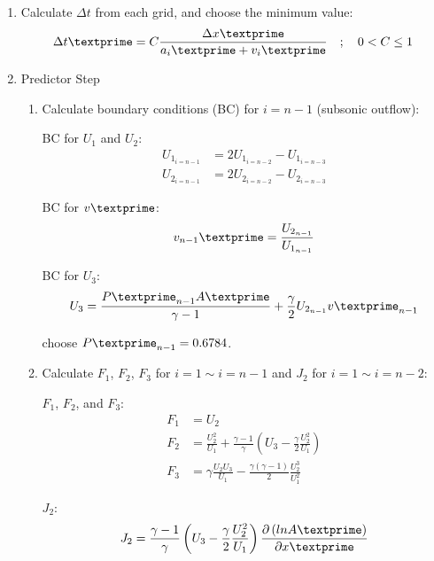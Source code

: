 \documentclass[12pt]{article}
\begin{document}
\begin{enumerate}
\begin{enumerate}
		\item Calculate $\Delta t$ from each grid, and choose the minimum value:
			\begin{equation}
				\Delta t\textprime = C\frac{\Delta x\textprime}{a_{i}\textprime + v_{i}\textprime}\hspace{1em};\hspace{1em}0 < C \leq 1
			\end{equation}
		\item Predictor Step
		\begin{enumerate}
			\item Calculate boundary conditions (BC) for $i = n-1$ (subsonic outflow):
				\par BC for $U_{1}$ and $U_{2}$:
				\begin{align}
					U_{1_{i=n-1}} &= 2U_{1_{i=n-2}} - U_{1_{i=n-3}} \\
					U_{2_{i=n-1}} &= 2U_{2_{i=n-2}} - U_{2_{i=n-3}}
				\end{align}
				\par BC for $v\textprime$:
				\begin{equation}
					v_{n-1}\textprime = \frac{U_{2_{n-1}}}{U_{1_{n-1}}}
				\end{equation}
				\par BC for $U_{3}$:
				\begin{equation}
					U_{3} 	= \frac{P\textprime_{n-1}A\textprime}{\gamma - 1} + \frac{\gamma}{2}U_{2_{n-1}}v\textprime_{n-1} \\
				\end{equation}
				\par choose $P\textprime_{n-1} = 0.6784$.
			\item Calculate $F_{1}$, $F_{2}$, $F_{3}$ for $i = 1 \sim i = n - 1$ and $J_{2}$ for $i = 1 \sim i = n - 2$:
				\par $F_{1}$, $F_{2}$, and $F_{3}$:
				\begin{align}
					F_{1}	&= U_{2} \\
					F_{2}	&= \frac{U_{2}^{2}}{U_{1}} + \frac{\gamma - 1}{\gamma}\left(U_{3} - \frac{\gamma}{2}\frac{U_{2}^{2}}{U_{1}}\right) \\
					F_{3}	&= \gamma\frac{U_{2}U_{3}}{U_{1}} - \frac{\gamma\left(\gamma - 1\right)}{2}\frac{U_{2}^{3}}{U_{1}^{2}}
				\end{align}
				\par $J_{2}$:
				\begin{align}
					J_{2} 	&= \frac{\gamma - 1}{\gamma}\left(U_{3} - \frac{\gamma}{2}\frac{U_{2}^{2}}{U_{1}}\right)\frac{\partial\left(ln A\textprime\right)}{\partial x\textprime} \\

\end{align}
\end{enumerate}
\end{enumerate}
\end{enumerate}
\end{document}
